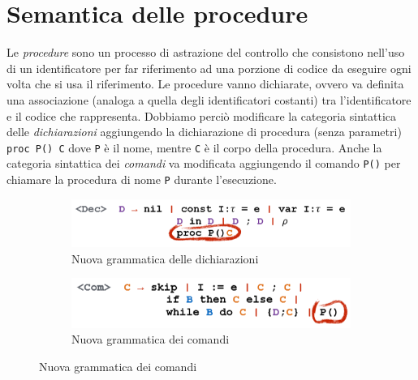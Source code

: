 \documentclass[a4paper,oneside,titlepage]{book}
\begin{document}
\section{Semantica delle procedure}
Le \textit{procedure} sono un processo di astrazione del controllo che consistono nell'uso di un identificatore per far riferimento ad una porzione di codice da eseguire ogni volta che si usa il riferimento. Le procedure vanno dichiarate, ovvero va definita una associazione (analoga a quella degli identificatori costanti) tra l'identificatore e il codice che rappresenta. Dobbiamo perciò modificare la categoria sintattica delle \textit{dichiarazioni} aggiungendo la dichiarazione di procedura (senza parametri) \lstinline|proc P() C| dove \lstinline|P| è il nome, mentre \lstinline|C| è il corpo della procedura. Anche la categoria sintattica dei \textit{comandi} va modificata aggiungendo il comando \lstinline|P()| per chiamare la procedura di nome \lstinline|P| durante l'esecuzione.
\begin{figure}[htp]
	\begin{subfigure}{0.49\textwidth}
		\includegraphics[width=\textwidth, height=\textheight, keepaspectratio]{decProc.png} 
		\caption{Nuova grammatica delle dichiarazioni}
	\end{subfigure}
	\hfill
	\begin{subfigure}{0.49\textwidth}
		\includegraphics[width=\textwidth, height=\textheight, keepaspectratio]{comProc.png}
		\caption{Nuova grammatica dei comandi}
	\end{subfigure}
\end{figure}
\end{document}
